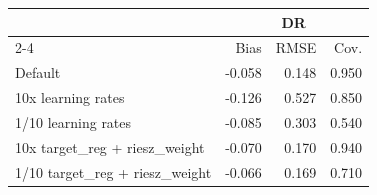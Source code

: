 \begin{tabular}{lrrr} 
\toprule 
& \multicolumn{3}{c}{DR} \\ 
\cmidrule(lr){2-4} 
&  Bias &  RMSE &  Cov. \\ 
\midrule 
Default & -0.058 & 0.148 & 0.950 \\ 
10x learning rates & -0.126 & 0.527 & 0.850 \\ 
1/10 learning rates & -0.085 & 0.303 & 0.540 \\ 
10x target_reg + riesz_weight & -0.070 & 0.170 & 0.940 \\ 
1/10 target_reg + riesz_weight & -0.066 & 0.169 & 0.710 \\ 
\bottomrule 
 \end{tabular}